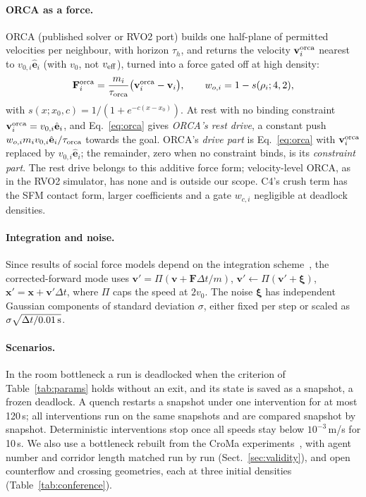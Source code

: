 \paragraph{ORCA as a force.}
ORCA (published solver or RVO2 port) builds one half-plane of permitted velocities per neighbour, with horizon $\tau_h$, and returns the velocity $\mathbf v^{\rm orca}_i$ nearest to $v_{0,i}\hat{\mathbf e}_i$ (with $v_0$, not $v_{\rm eff}$), turned into a force gated off at high density:
\begin{equation}\label{eq:orca}
\mathbf F^{\rm orca}_i=\frac{m_i}{\tau_{\rm orca}}\bigl(\mathbf v^{\rm orca}_i-\mathbf v_i\bigr),\qquad w_{o,i}=1-s(\rho_i;4,2),
\end{equation}
with $s(x;x_0,c)=1/(1+e^{-c(x-x_0)})$. At rest with no binding constraint $\mathbf v^{\rm orca}_i=v_{0,i}\hat{\mathbf e}_i$, and Eq.~\eqref{eq:orca} gives \emph{ORCA's rest drive}, a constant push $w_{o,i}m_iv_{0,i}\hat{\mathbf e}_i/\tau_{\rm orca}$ towards the goal. ORCA's \emph{drive part} is Eq.~\eqref{eq:orca} with $\mathbf v^{\rm orca}_i$ replaced by $v_{0,i}\hat{\mathbf e}_i$; the remainder, zero when no constraint binds, is its \emph{constraint part}. The rest drive belongs to this additive force form; velocity-level ORCA, as in the RVO2 simulator, has none and is outside our scope. C4's crush term has the SFM contact form, larger coefficients and a gate $w_{c,i}$ negligible at deadlock densities.

\paragraph{Integration and noise.}
Since results of social force models depend on the integration scheme~\cite{koster2013}, the corrected-forward mode uses $\mathbf v'=\Pi(\mathbf v+\mathbf F\Delta t/m)$, $\mathbf v'\leftarrow\Pi(\mathbf v'+\boldsymbol\xi)$, $\mathbf x'=\mathbf x+\mathbf v'\Delta t$, where $\Pi$ caps the speed at $2v_0$. The noise $\boldsymbol\xi$ has independent Gaussian components of standard deviation $\sigma$, either fixed per step or scaled as $\sigma\sqrt{\Delta t/0.01\,{\rm s}}$.

\paragraph{Scenarios.}
In the room bottleneck a run is deadlocked when the criterion of Table~\ref{tab:params} holds without an exit, and its state is saved as a snapshot, a frozen deadlock. A quench restarts a snapshot under one intervention for at most 120\,s; all interventions run on the same snapshots and are compared snapshot by snapshot. Deterministic interventions stop once all speeds stay below $10^{-3}$\,m/s for 10\,s. We also use a bottleneck rebuilt from the CroMa experiments~\cite{fzj_ped20219}, with agent number and corridor length matched run by run (Sect.~\ref{sec:validity}), and open counterflow and crossing geometries, each at three initial densities (Table~\ref{tab:conference}).

